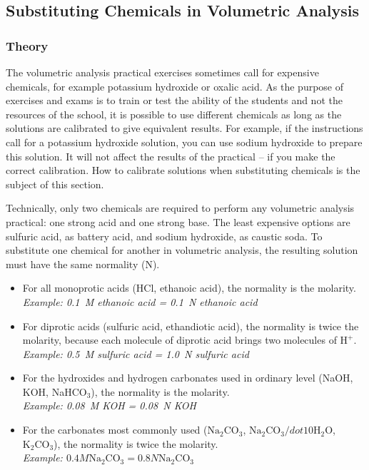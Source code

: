 \subsection{Substituting Chemicals in Volumetric Analysis}
\label{cha:subchemvolana}
\subsubsection{Theory}

The volumetric analysis practical exercises sometimes call for expensive chemicals, for example potassium hydroxide or oxalic acid. As the purpose of exercises and exams is to train or test the ability of the students and not the resources of the school, it is possible to use different chemicals as long as the solutions are calibrated to give equivalent results. For example, if the instructions call for a potassium hydroxide solution, you can use sodium hydroxide to prepare this solution. It will not affect the results of the practical -- if you make the correct calibration. How to calibrate solutions when substituting chemicals is the subject of this section.

Technically, only two chemicals are required to perform any volumetric analysis practical: one strong acid and one strong base. The least expensive options are sulfuric acid, as battery acid, and sodium hydroxide, as caustic soda. To substitute one chemical for another in volumetric analysis, the resulting solution must have the same normality (N).

\begin{itemize}

\item{For all monoprotic acids (HCl, ethanoic acid), the normality is the molarity.\\
\textit{Example: 0.1~M ethanoic acid = 0.1~N ethanoic acid}}
\item{For diprotic acids (sulfuric acid, ethandiotic acid), the normality is twice the molarity, because each molecule of diprotic acid brings two molecules of $\mathrm{H}^{+}$.\\
\textit{Example: 0.5~M sulfuric acid = 1.0~N sulfuric acid}}
\item{For the hydroxides and hydrogen carbonates used in ordinary level (NaOH, KOH, NaHCO$_{3}$), the normality is the molarity.\\
\textit{Example: 0.08~M KOH = 0.08~N KOH}}
\item{For the carbonates most commonly used ($\mathrm{Na}_2\mathrm{CO}_3$, $\mathrm{Na}_2\mathrm{CO}_3 /dot 10\mathrm{H}_2\mathrm{O}$, $\mathrm{K}_2\mathrm{CO}_3$), the normality is twice the molarity.\\
\textit{Example: $0.4 M \mathrm{Na}_2\mathrm{CO}_3 = 0.8 N \mathrm{Na}_2\mathrm{CO}_3$}}

\end{itemize}

